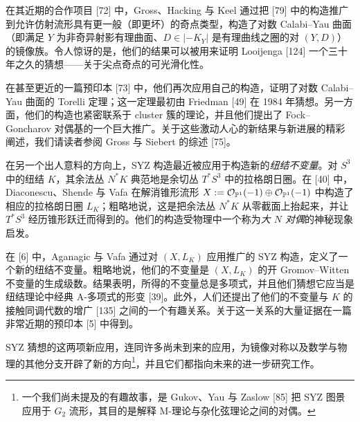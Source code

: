 在其近期的合作项目 [72] 中，Gross、Hacking 与 Keel 通过把 [79] 中的构造推广到允许仿射流形具有更一般（即更坏）的奇点类型，构造了对数 Calabi--Yau 曲面（即满足 $Y$ 为非奇异射影有理曲面、$D \in |{-K_Y}|$ 是有理曲线之圈的对 $(Y,D)$）的镜像族。令人惊讶的是，他们的结果可以被用来证明 Looijenga [124] 一个三十年之久的猜想------关于尖点奇点的可光滑化性。

在甚至更近的一篇预印本 [73] 中，他们再次应用自己的构造，证明了对数 Calabi--Yau 曲面的 Torelli 定理；这一定理最初由 Friedman [49] 在 1984 年猜想。另一方面，他们的构造也紧密联系于 cluster 簇的理论，并且他们提出了 Fock--Goncharov 对偶基的一个巨大推广。关于这些激动人心的新结果与新进展的精彩阐述，我们请读者参阅 Gross 与 Siebert 的综述 [75]。

在另一个出人意料的方向上，SYZ 构造最近被应用于构造新的\emph{纽结不变量}。对 $S^3$ 中的纽结 $K$，其余法丛 $N^*K$ 典范地是余切丛 $T^*S^3$ 中的拉格朗日圈。在 [40] 中，Diaconescu、Shende 与 Vafa 在解消锥形流形 $X := \mathcal{O}_{\mathbb{P}^1}(-1) \oplus \mathcal{O}_{\mathbb{P}^1}(-1)$ 中构造了相应的拉格朗日圈 $L_K$；粗略地说，这是把余法丛 $N^*K$ 从零截面上抬起来，并让 $T^*S^3$ 经历锥形跃迁而得到的。他们的构造受物理中一个称为\emph{大 $N$ 对偶}的神秘现象启发。

在 [6] 中，Aganagic 与 Vafa 通过对 $(X,L_K)$ 应用推广的 SYZ 构造，定义了一个新的纽结不变量。粗略地说，他们的不变量是 $(X,L_K)$ 的开 Gromov--Witten 不变量的生成级数。结果表明，所得的不变量总是多项式，并且他们猜想它应当是纽结理论中经典 A-多项式的形变 [39]。此外，人们还提出了他们的不变量与 $K$ 的接触同调代数的增广 [135] 之间的一个有趣关系。关于这一关系的大量证据在一篇非常近期的预印本 [5] 中得到。

SYZ 猜想的这两项新应用，连同许多尚未到来的应用，为镜像对称以及数学与物理的其他分支开辟了新的方向\footnote{一个我们尚未提及的有趣故事，是 Gukov、Yau 与 Zaslow [85] 把 SYZ 图景应用于 $G_2$ 流形，其目的是解释 M-理论与杂化弦理论之间的对偶。}，并且它们都指向未来的进一步研究工作。
